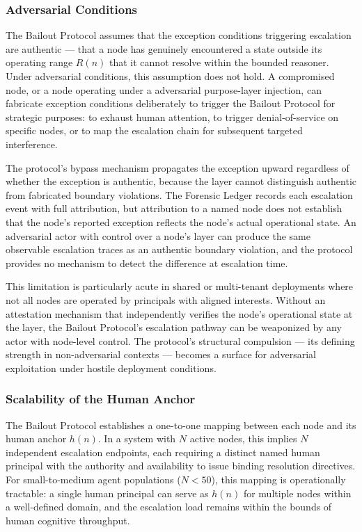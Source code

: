\subsubsection{Adversarial Conditions}

The Bailout Protocol assumes that the exception conditions triggering escalation are authentic --- that a node has genuinely encountered a state outside its operating range $R(n)$ that it cannot resolve within the bounded reasoner. Under adversarial conditions, this assumption does not hold. A compromised node, or a node operating under a adversarial purpose-layer injection, can fabricate exception conditions deliberately to trigger the Bailout Protocol for strategic purposes: to exhaust human attention, to trigger denial-of-service on specific nodes, or to map the escalation chain for subsequent targeted interference.

The protocol's bypass mechanism propagates the exception upward regardless of whether the exception is authentic, because the \bounds{} layer cannot distinguish authentic from fabricated boundary violations. The Forensic Ledger records each escalation event with full attribution, but attribution to a named node does not establish that the node's reported exception reflects the node's actual operational state. An adversarial actor with control over a node's \bounds{} layer can produce the same observable escalation traces as an authentic boundary violation, and the protocol provides no mechanism to detect the difference at escalation time.

This limitation is particularly acute in shared or multi-tenant \bxthree{} deployments where not all nodes are operated by principals with aligned interests. Without an attestation mechanism that independently verifies the node's operational state at the \fact{} layer, the Bailout Protocol's escalation pathway can be weaponized by any actor with node-level control. The protocol's structural compulsion --- its defining strength in non-adversarial contexts --- becomes a surface for adversarial exploitation under hostile deployment conditions.

\subsubsection{Scalability of the Human Anchor}

The Bailout Protocol establishes a one-to-one mapping between each node and its human anchor $h(n)$. In a \bxthree{} system with $N$ active nodes, this implies $N$ independent escalation endpoints, each requiring a distinct named human principal with the authority and availability to issue binding resolution directives. For small-to-medium agent populations ($N < 50$), this mapping is operationally tractable: a single human principal can serve as $h(n)$ for multiple nodes within a well-defined domain, and the escalation load remains within the bounds of human cognitive throughput.

